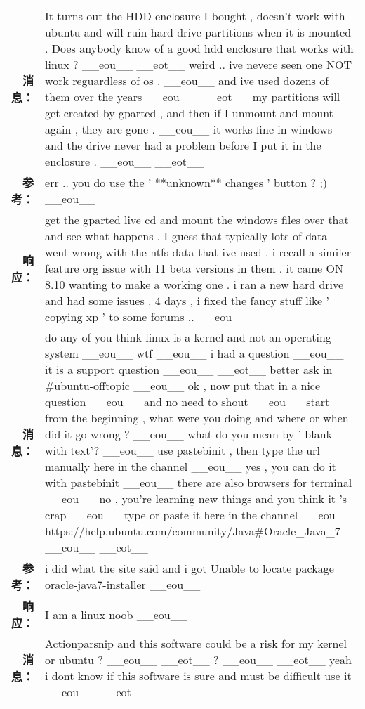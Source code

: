 \begin{tabularx}{0.8\textwidth}{@{}rX@{}}%
\toprule%
\midrule%
\textbf{消息：}&It turns out the HDD enclosure I bought , doesn't work with ubuntu and will ruin hard drive partitions when it is mounted . Does anybody know of a good hdd enclosure that works with linux ? \_\_eou\_\_ \_\_eot\_\_ weird .. ive nevere seen one NOT work reguardless of os . \_\_eou\_\_ and ive used dozens of them over the years \_\_eou\_\_ \_\_eot\_\_ my partitions will get created by gparted , and then if I unmount and mount again , they are gone . \_\_eou\_\_ it works fine in windows and the drive never had a problem before I put it in the enclosure . \_\_eou\_\_ \_\_eot\_\_\\%
\textbf{参考：}&err .. you do use the ' **unknown** changes ' button ? ;) \_\_eou\_\_\\%
\textbf{响应：}&get the gparted live cd and mount the windows files over that and see what happens . I guess that typically lots of data went wrong with the ntfs data that ive used . i recall a similer feature org issue with 11 beta versions in them . it came ON 8.10 wanting to make a working one . i ran a new hard drive and had some issues . 4 days , i fixed the fancy stuff like ' copying xp ' to some forums .. \_\_eou\_\_\\%
\midrule%
\textbf{消息：}&do any of you think linux is a kernel and not an operating system \_\_eou\_\_ wtf \_\_eou\_\_ i had a question \_\_eou\_\_ it is a support question \_\_eou\_\_ \_\_eot\_\_ better ask in \#ubuntu{-}offtopic \_\_eou\_\_ ok , now put that in a nice question \_\_eou\_\_ and no need to shout \_\_eou\_\_ start from the beginning , what were you doing and where or when did it go wrong ? \_\_eou\_\_ what do you mean by ' blank with text'? \_\_eou\_\_ use pastebinit , then type the url manually here in the channel \_\_eou\_\_ yes , you can do it with pastebinit \_\_eou\_\_ there are also browsers for terminal \_\_eou\_\_ no , you're learning new things and you think it 's crap \_\_eou\_\_ type or paste it here in the channel \_\_eou\_\_ https://help.ubuntu.com/community/Java\#Oracle\_Java\_7 \_\_eou\_\_ \_\_eot\_\_\\%
\textbf{参考：}&i did what the site said and i got Unable to locate package oracle{-}java7{-}installer \_\_eou\_\_\\%
\textbf{响应：}&I am a linux noob \_\_eou\_\_\\%
\midrule%
\textbf{消息：}&Actionparsnip and this software could be a risk for my kernel or ubuntu ? \_\_eou\_\_ \_\_eot\_\_ ? \_\_eou\_\_ \_\_eot\_\_ yeah i dont know if this software is sure and must be difficult use it \_\_eou\_\_ \_\_eot\_\_\\%

\end{tabularx}
